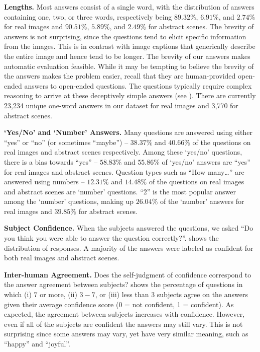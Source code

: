 \textbf{Lengths.}
Most answers consist of a single word, with the distribution of answers containing one, two, or three words, respectively being $89.32\%$, $6.91\%$, and $2.74\%$ for real images and $90.51\%$, $5.89\%$, and $2.49\%$ for abstract scenes.
The brevity of answers is not surprising, since the questions tend to elicit specific
information from the images. This is in contrast with image captions that generically
describe the entire image and hence tend to be longer. The brevity of our answers makes
automatic evaluation feasible. While it may be tempting to believe the brevity of the answers
makes the problem easier, recall that they are human-provided open-ended answers to
open-ended questions. The questions typically require complex reasoning to arrive at these
deceptively simple answers (see ).
There are currently 23,234 unique one-word answers in our dataset for real images and 3,770 for abstract scenes.

\textbf{`Yes/No' and `Number' Answers.}
Many questions are answered using either ``yes'' or ``no'' (or sometimes ``maybe'') -- 
$38.37\%$ and $40.66\%$ of the questions on real images and abstract scenes respectively. 
Among these `yes/no' questions, there is a bias towards %
``yes'' -- %
$58.83\%$ and $55.86\%$ of `yes/no' answers are ``yes'' for real images and abstract scenes. 
Question types such as ``How many\ldots'' are answered using numbers -- 
$12.31\%$ and $14.48\%$ of the questions on real images and abstract scenes are `number' questions. 
``2'' is the most popular answer among the `number' questions, making up 
$26.04\%$ of the `number' answers for real images and $39.85\%$ for abstract scenes. 

\textbf{Subject Confidence.}
When the subjects answered the questions, we asked
``Do you think you were able to answer the question correctly?''.
 shows the distribution of responses. A majority of the answers
were labeled as confident for both real images and abstract scenes. %

\textbf{Inter-human Agreement.}
Does the self-judgment of confidence correspond to the answer agreement between subjects?
 shows the percentage of questions in which 
(i) $7$ or more, 
(ii) $3-7$, or 
(iii) less than $3$ subjects agree on the answers given their average confidence score 
(0 = not confident, 1 = confident).
As expected, the agreement between subjects increases with confidence.
However, even if all of the subjects are confident the answers may still vary.
This is not surprising since some answers may vary, yet have very similar meaning, such as ``happy'' and ``joyful''.

